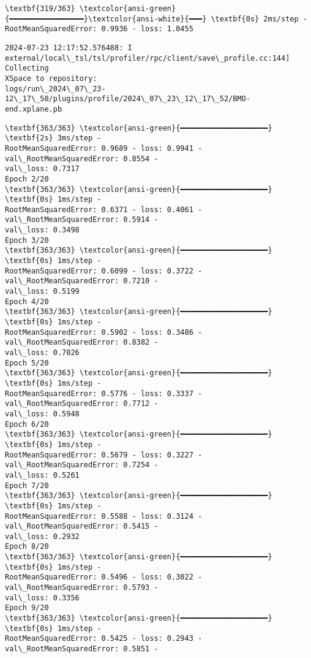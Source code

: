 \documentclass[12pt letter]{report}
\begin{document}
    \begin{Verbatim}[commandchars=\\\{\}]
\textbf{319/363} \textcolor{ansi-green}{━━━━━━━━━━━━━━━━━}\textcolor{ansi-white}{━━━} \textbf{0s} 2ms/step -
RootMeanSquaredError: 0.9936 - loss: 1.0455
    \end{Verbatim}

    \begin{Verbatim}[commandchars=\\\{\}]
2024-07-23 12:17:52.576488: I
external/local\_tsl/tsl/profiler/rpc/client/save\_profile.cc:144] Collecting
XSpace to repository:
logs/run\_2024\_07\_23-12\_17\_50/plugins/profile/2024\_07\_23\_12\_17\_52/BMO-
end.xplane.pb
    \end{Verbatim}

    \begin{Verbatim}[commandchars=\\\{\}]
\textbf{363/363} \textcolor{ansi-green}{━━━━━━━━━━━━━━━━━━━━} \textbf{2s} 3ms/step -
RootMeanSquaredError: 0.9689 - loss: 0.9941 - val\_RootMeanSquaredError: 0.8554 -
val\_loss: 0.7317
Epoch 2/20
\textbf{363/363} \textcolor{ansi-green}{━━━━━━━━━━━━━━━━━━━━} \textbf{0s} 1ms/step -
RootMeanSquaredError: 0.6371 - loss: 0.4061 - val\_RootMeanSquaredError: 0.5914 -
val\_loss: 0.3498
Epoch 3/20
\textbf{363/363} \textcolor{ansi-green}{━━━━━━━━━━━━━━━━━━━━} \textbf{0s} 1ms/step -
RootMeanSquaredError: 0.6099 - loss: 0.3722 - val\_RootMeanSquaredError: 0.7210 -
val\_loss: 0.5199
Epoch 4/20
\textbf{363/363} \textcolor{ansi-green}{━━━━━━━━━━━━━━━━━━━━} \textbf{0s} 1ms/step -
RootMeanSquaredError: 0.5902 - loss: 0.3486 - val\_RootMeanSquaredError: 0.8382 -
val\_loss: 0.7026
Epoch 5/20
\textbf{363/363} \textcolor{ansi-green}{━━━━━━━━━━━━━━━━━━━━} \textbf{0s} 1ms/step -
RootMeanSquaredError: 0.5776 - loss: 0.3337 - val\_RootMeanSquaredError: 0.7712 -
val\_loss: 0.5948
Epoch 6/20
\textbf{363/363} \textcolor{ansi-green}{━━━━━━━━━━━━━━━━━━━━} \textbf{0s} 1ms/step -
RootMeanSquaredError: 0.5679 - loss: 0.3227 - val\_RootMeanSquaredError: 0.7254 -
val\_loss: 0.5261
Epoch 7/20
\textbf{363/363} \textcolor{ansi-green}{━━━━━━━━━━━━━━━━━━━━} \textbf{0s} 1ms/step -
RootMeanSquaredError: 0.5588 - loss: 0.3124 - val\_RootMeanSquaredError: 0.5415 -
val\_loss: 0.2932
Epoch 8/20
\textbf{363/363} \textcolor{ansi-green}{━━━━━━━━━━━━━━━━━━━━} \textbf{0s} 1ms/step -
RootMeanSquaredError: 0.5496 - loss: 0.3022 - val\_RootMeanSquaredError: 0.5793 -
val\_loss: 0.3356
Epoch 9/20
\textbf{363/363} \textcolor{ansi-green}{━━━━━━━━━━━━━━━━━━━━} \textbf{0s} 1ms/step -
RootMeanSquaredError: 0.5425 - loss: 0.2943 - val\_RootMeanSquaredError: 0.5851 -

\end{Verbatim}
\end{document}
